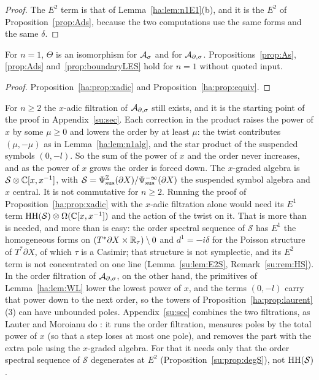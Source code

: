 \begin{proof}
The \(E^2\) term is that of Lemma~\ref{ha:lem:n1E1}(b), and it is the
\(E^2\) of Proposition~\ref{prop:Ads}, because the two computations use
the same forms and the same \(\delta\).
\end{proof}

\begin{corollary}[(B10) for \(n=1\)]\label{ha:cor:n1}
For \(n=1\), \(\Theta\) is an isomorphism for \(\mathcal A_\sigma\) and for \(\mathcal A_{\partial,\sigma}\).
Propositions~\ref{prop:As}, \ref{prop:Ads} and~\ref{prop:boundaryLES}
hold for \(n=1\) without quoted input.
\end{corollary}

\begin{proof}
Proposition~\ref{ha:prop:xadic} and Proposition~\ref{ha:prop:equiv}.
\end{proof}

\begin{remark}\label{ha:rem:xadicfail}
For \(n\ge2\) the \(x\)-adic filtration of \(\mathcal A_{\partial,\sigma}\) still exists, and it
is the starting point of the proof in Appendix~\ref{su:sec}. Each
correction in the product raises the power of \(x\) by some \(\mu\ge0\)
and lowers the order by at least \(\mu\): the twist contributes
\((\mu,-\mu)\) as in Lemma~\ref{ha:lem:n1alg}, and the star product of
the suspended symbols \((0,-l)\). So the sum of the power of \(x\) and the
order never increases, and as the power of \(x\) grows the order is forced
down. The \(x\)-graded algebra is \(\mathcal S\otimes\mathbb C[x,x^{-1}]\), with
\(\mathcal S=\Psi_{\mathrm{sus}}^{\mathbb Z}(\partial X)/\Psi_{\mathrm{sus}}^{-\infty}(\partial X)\) the
suspended symbol algebra and \(x\) central. It is not commutative for
\(n\ge2\). Running the proof of Proposition~\ref{ha:prop:xadic} with the
\(x\)-adic filtration alone would need its \(E^1\) term
\(\operatorname{HH}(\mathcal S)\otimes\Omega(\mathbb C[x,x^{-1}])\) and the action of the twist
on it. That is more than is needed, and more than is easy: the order
spectral sequence of \(\mathcal S\) has \(E^1\) the homogeneous forms on
\((T^*\partial X\times\mathbb R_\tau)\setminus0\) and \(d^1=-i\delta\) for the
Poisson structure of \(T^*\partial X\), of which \(\tau\) is a Casimir;
that structure is not symplectic, and its \(E^2\) term is not
concentrated on one line (Lemma~\ref{su:lem:E2S},
Remark~\ref{su:rem:HS}). In the order filtration of \(\mathcal A_{\partial,\sigma}\), on the
other hand, the primitives of Lemma~\ref{ha:lem:WL} lower the lowest power
of \(x\), and the terms \((0,-l)\) carry that power down to the next
order, so the towers of Proposition~\ref{ha:prop:laurent}(3) can have
unbounded poles. Appendix~\ref{su:sec} combines the two filtrations, as
Lauter and Moroianu do \cite{LauterMoroianu}: it runs the order
filtration, measures poles by the total power of \(x\) (so that a step
loses at most one pole), and removes the part with the extra pole using
the \(x\)-graded algebra. For that it needs only that the order spectral
sequence of \(\mathcal S\) degenerates at \(E^2\)
(Proposition~\ref{su:prop:degS}), not \(\operatorname{HH}(\mathcal S)\).
\end{remark}

